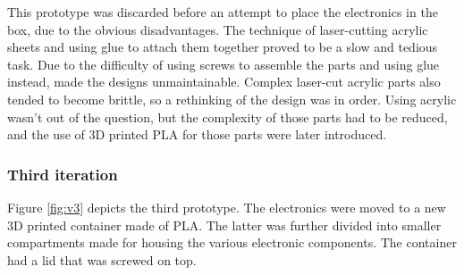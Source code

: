 This prototype was discarded before an attempt to place the electronics in the box, due to the obvious disadvantages. The technique of laser-cutting acrylic sheets and using glue to attach them together proved to be a slow and tedious task. Due to the difficulty of using screws to assemble the parts and using glue instead, made the designs unmaintainable. Complex laser-cut acrylic parts also tended to become brittle, so a rethinking of the design was in order. Using acrylic wasn't out of the question, but the complexity of those parts had to be reduced, and the use of 3D printed PLA for those parts were later introduced. \\


\subsubsection{Third iteration}

Figure \ref{fig:v3} depicts the third prototype. The electronics were moved to a new 3D printed container made of PLA. The latter was further divided into smaller compartments made for housing the various electronic components. The container had a lid that was screwed on top.


